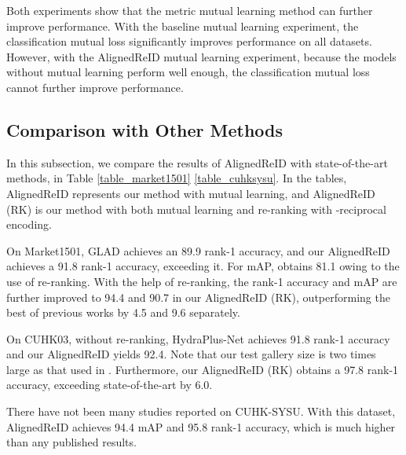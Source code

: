 \documentclass[10pt,twocolumn,letterpaper]{article}
\begin{document}
Both experiments show that the metric mutual learning method can further improve performance.
With the baseline mutual learning experiment, the classification mutual loss significantly improves performance on all datasets.
However, with the AlignedReID mutual learning experiment, because the models without mutual learning perform well enough, the classification mutual loss cannot further improve performance.

\subsection{Comparison with Other Methods}
In this subsection, we compare the results of AlignedReID with state-of-the-art methods, in Table \ref{table_market1501}  \ref{table_cuhksysu}.
In the tables, AlignedReID represents our method with mutual learning, and AlignedReID (RK) is our method with both mutual learning and re-ranking \cite{zhong2017re} with -reciprocal encoding.

On Market1501, GLAD \cite{wei2017glad} achieves an 89.9 rank-1 accuracy, and our AlignedReID achieves a 91.8 rank-1 accuracy, exceeding it.
For mAP, \cite{hermans2017defense} obtains 81.1 owing to the use of re-ranking.
With the help of re-ranking, the rank-1 accuracy and mAP are further improved to 94.4 and 90.7 in our AlignedReID (RK),
outperforming the best of previous works by 4.5 and 9.6 separately.

On CUHK03, without re-ranking, HydraPlus-Net \cite{Liu2017HydraPlus} achieves 91.8 rank-1 accuracy and our AlignedReID yields 92.4.
Note that our test gallery size is two times large as that used in \cite{Liu2017HydraPlus}.
Furthermore, our AlignedReID (RK) obtains a 97.8 rank-1 accuracy, exceeding state-of-the-art by 6.0.

There have not been many studies reported on CUHK-SYSU.
With this dataset, AlignedReID achieves 94.4 mAP and 95.8 rank-1 accuracy, which is much higher than any published results.
\end{document}
